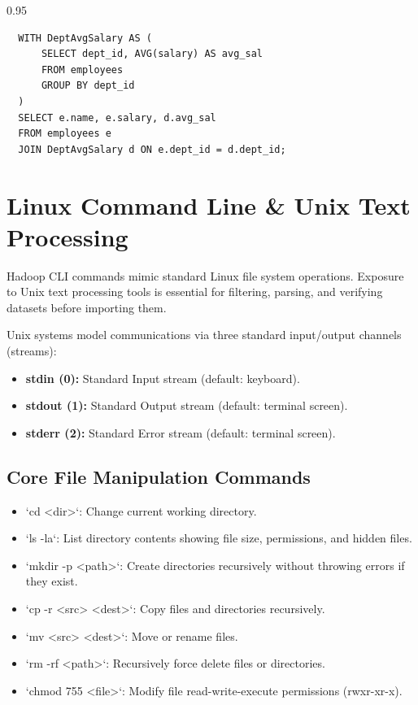 \documentclass[12pt,a4paper]{article}
\begin{document}
\begin{tcolorbox}[examplebox, title={Common Table Expression (CTE) Syntax}]
  \begin{spacing}{0.95}
  \begin{verbatim}
  WITH DeptAvgSalary AS (
      SELECT dept_id, AVG(salary) AS avg_sal
      FROM employees
      GROUP BY dept_id
  )
  SELECT e.name, e.salary, d.avg_sal
  FROM employees e
  JOIN DeptAvgSalary d ON e.dept_id = d.dept_id;
  \end{verbatim}
  \end{spacing}
\end{tcolorbox}

\section{Linux Command Line \& Unix Text Processing}

Hadoop CLI commands mimic standard Linux file system operations. Exposure to Unix text processing tools is essential for filtering, parsing, and verifying datasets before importing them.

\begin{tcolorbox}[defbox, title={Unix Streams}]
  Unix systems model communications via three standard input/output channels (streams):
  \begin{itemize}[leftmargin=*, noitemsep]
    \item \textbf{stdin (0):} Standard Input stream (default: keyboard).
    \item \textbf{stdout (1):} Standard Output stream (default: terminal screen).
    \item \textbf{stderr (2):} Standard Error stream (default: terminal screen).
  \end{itemize}
\end{tcolorbox}

\subsection{Core File Manipulation Commands}
\begin{itemize}[leftmargin=*, itemsep=3pt]
  \item `cd <dir>`: Change current working directory.
  \item `ls -la`: List directory contents showing file size, permissions, and hidden files.
  \item `mkdir -p <path>`: Create directories recursively without throwing errors if they exist.
  \item `cp -r <src> <dest>`: Copy files and directories recursively.
  \item `mv <src> <dest>`: Move or rename files.
  \item `rm -rf <path>`: Recursively force delete files or directories.
  \item `chmod 755 <file>`: Modify file read-write-execute permissions (rwxr-xr-x).
\end{itemize}
\end{document}
